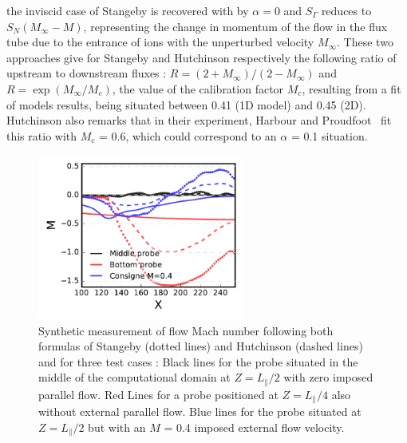 \documentclass[cpp,a4paper,fleqn,twoside%
]{w-art}
\begin{document}
the inviscid case of Stangeby is recovered with by $\alpha=0$ and 
$S_\Gamma$ reduces to 
$S_N\left(M_\infty-M \right)$, representing the change in 
momentum of the flow in the flux tube due to the entrance of ions with 
the unperturbed velocity $M_\infty$. These two approaches give 
for Stangeby and Hutchinson respectively the following ratio of 
upstream to downstream fluxes : $R=(2+M_\infty)/(2-M_\infty)$ and 
$R=\exp\left(M_\infty/M_c\right)$, the value of the calibration factor 
$M_c$, resulting from a fit of models results, being 
situated between 0.41 (1D model) and 0.45 (2D). Hutchinson also remarks 
that in their experiment, Harbour and Proudfoot~\cite{Harbour84} fit this 
ratio with $M_c$ = 0.6, which could correspond to an $\alpha$ = 0.1 situation.

\begin{figure}
\begin{minipage}[c]{68mm}
\includegraphics[width=68mm]{figures/hutchMachRadialProf.pdf}
\end{minipage}
\begin{minipage}[c]{\textwidth-68mm}
\caption{Synthetic measurement of flow Mach number following both 
formulas of Stangeby (dotted lines) and Hutchinson (dashed lines) and 
for three test cases : Black lines for the probe situated in the middle of the 
computational domain at $Z=L_\parallel/2$ with zero imposed parallel 
flow. Red Lines for a probe 
positioned at $Z=L_\parallel/4$ also without external parallel flow. 
Blue lines for the probe situated at $Z=L_\parallel/2$ but with an 
$M$ = 0.4 imposed external flow velocity.}
\label{fig:6}
\end{minipage}
\end{figure}
\end{document}
